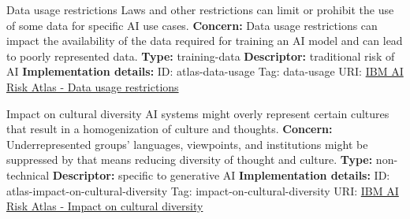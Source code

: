\begin{definitionbox}{Data usage restrictions}
Laws and other restrictions can limit or prohibit the use of some data for specific AI use cases.\newline\newline
\textbf{Concern: }Data usage restrictions can impact the availability of the data required for training an AI model and can lead to poorly represented data.\newline\newline
\textbf{Type: }training-data\newline
\textbf{Descriptor: }traditional risk of AI \newline\newline
\textbf{Implementation details: } \newline
ID: atlas-data-usage \newline
Tag: data-usage \newline
URI:  \href{https://www.ibm.com/docs/en/watsonx/saas?topic=SSYOK8/wsj/ai-risk-atlas/data-usage.html}{IBM AI Risk Atlas - Data usage restrictions}\newline
\end{definitionbox}
\begin{definitionbox}{Impact on cultural diversity}
AI systems might overly represent certain cultures that result in a homogenization of culture and thoughts.\newline\newline
\textbf{Concern: }Underrepresented groups' languages, viewpoints, and institutions might be suppressed by that means reducing diversity of thought and culture.\newline\newline
\textbf{Type: }non-technical\newline
\textbf{Descriptor: }specific to generative AI \newline\newline
\textbf{Implementation details: } \newline
ID: atlas-impact-on-cultural-diversity \newline
Tag: impact-on-cultural-diversity \newline
URI:  \href{https://www.ibm.com/docs/en/watsonx/saas?topic=SSYOK8/wsj/ai-risk-atlas/impact-on-cultural-diversity.html}{IBM AI Risk Atlas - Impact on cultural diversity}\newline
\end{definitionbox}
